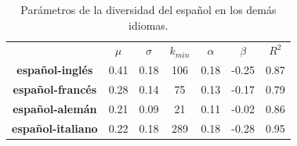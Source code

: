 \begin{table}[h!]
	\centering
	\begin{tabular}{ccccccc}
		\textbf{}                & \textbf{$\mu$} & \textbf{$\sigma$} & \textbf{$k_{min}$} & \textbf{$\alpha$} & \textbf{$\beta$} & \textbf{$R^{2}$} \\
		\textbf{español-inglés}  & 0.41          & 0.18                & 106                   & 0.18           & -0.25        & 0.87        \\
		\textbf{español-francés}   & 0.28           & 0.14                & 75                   & 0.13           & -0.17         & 0.79        \\
		\textbf{español-alemán} & 0.21           & 0.09                & 21                    & 0.11           & -0.02         & 0.86        \\
		\textbf{español-italiano}  & 0.22          & 0.18                & 289                    & 0.18           & -0.28         & 0.95       
	\end{tabular}
	\caption{Parámetros de la diversidad del español en los demás idiomas.}
	\label{tab.DR_SP}
\end{table}